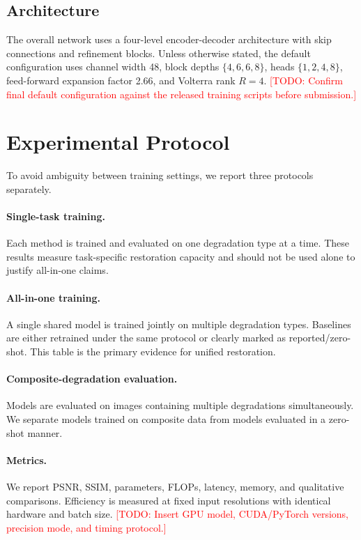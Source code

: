 \documentclass[10pt,twocolumn]{article}
\newcommand{\todo}[1]{\textcolor{red}{[TODO: #1]}}
\begin{document}
\subsection{Architecture}
The overall network uses a four-level encoder-decoder architecture with skip connections and refinement blocks. Unless otherwise stated, the default configuration uses channel width 48, block depths $\{4,6,6,8\}$, heads $\{1,2,4,8\}$, feed-forward expansion factor 2.66, and Volterra rank $R=4$. \todo{Confirm final default configuration against the released training scripts before submission.}

\section{Experimental Protocol}
To avoid ambiguity between training settings, we report three protocols separately.

\paragraph{Single-task training.}
Each method is trained and evaluated on one degradation type at a time. These results measure task-specific restoration capacity and should not be used alone to justify all-in-one claims.

\paragraph{All-in-one training.}
A single shared model is trained jointly on multiple degradation types. Baselines are either retrained under the same protocol or clearly marked as reported/zero-shot. This table is the primary evidence for unified restoration.

\paragraph{Composite-degradation evaluation.}
Models are evaluated on images containing multiple degradations simultaneously. We separate models trained on composite data from models evaluated in a zero-shot manner.

\paragraph{Metrics.}
We report PSNR, SSIM, parameters, FLOPs, latency, memory, and qualitative comparisons. Efficiency is measured at fixed input resolutions with identical hardware and batch size. \todo{Insert GPU model, CUDA/PyTorch versions, precision mode, and timing protocol.}
\end{document}
